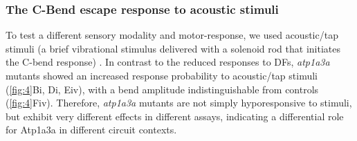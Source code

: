 \documentclass[9.5pt,lineno]{RandlettLab_elife}
\begin{document}
\subsubsection{The C-Bend escape response to acoustic stimuli}
To test a different sensory modality and motor-response, we used acoustic/tap stimuli (a brief vibrational stimulus delivered with a solenoid rod that initiates the C-bend response) \citep{Burgess2007-2}. In contrast to the reduced responses to DFs, \emph{atp1a3a} mutants showed an increased response probability to acoustic/tap stimuli (\autoref{fig:4}Bi, Di, Eiv), with a bend amplitude indistinguishable from controls (\autoref{fig:4}Fiv). 
Therefore, \emph{atp1a3a} mutants are not simply hyporesponsive to stimuli, but exhibit very different effects in different assays, indicating a differential role for Atp1a3a in different circuit contexts. 
\end{document}
